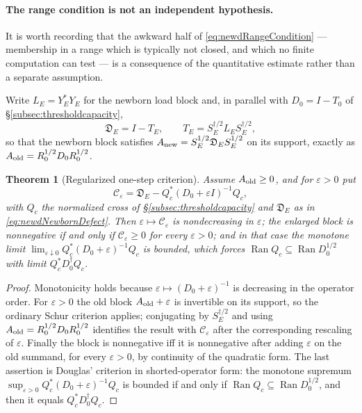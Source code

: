 \documentclass[11pt]{amsart}
\newtheorem{theorem}{Theorem}[section]
\theoremstyle{definition}
\theoremstyle{remark}
\begin{document}
\paragraph{The range condition is not an independent hypothesis.}
It is worth recording that the awkward half of
\eqref{eq:newdRangeCondition} --- membership in a range which is typically
not closed, and which no finite computation can test --- is a consequence of
the quantitative estimate rather than a separate assumption.

Write \(L_E=Y_E^*Y_E\) for the newborn load block and, in parallel with
\(D_0=I-T_0\) of \S\ref{subsec:thresholdcapacity},
\begin{equation}\label{eq:newdNewbornDefect}
 \mathfrak D_E=I-T_E,
 \qquad
 T_E=S_E^{\dagger/2}L_ES_E^{\dagger/2},
\end{equation}
so that the newborn block satisfies
\(A_{\rm new}=S_E^{1/2}\mathfrak D_ES_E^{1/2}\) on its support, exactly as
\(A_{\rm old}=R_0^{1/2}D_0R_0^{1/2}\).

\begin{theorem}[Regularized one-step criterion]\label{thm:newdRegularizedStep}
Assume \(A_{\rm old}\ge0\), and for \(\varepsilon>0\) put
\[
 \mathcal C_\varepsilon
 =\mathfrak D_E-Q_c^*(D_0+\varepsilon I)^{-1}Q_c ,
\]
with \(Q_c\) the normalized cross of \S\ref{subsec:thresholdcapacity} and
\(\mathfrak D_E\) as in \eqref{eq:newdNewbornDefect}.
Then \(\varepsilon\mapsto\mathcal C_\varepsilon\) is nondecreasing in
\(\varepsilon\); the enlarged block is nonnegative if and only if
\(\mathcal C_\varepsilon\ge0\) for every \(\varepsilon>0\); and in that case
the monotone limit \(\lim_{\varepsilon\downarrow0}
Q_c^*(D_0+\varepsilon)^{-1}Q_c\) is bounded, which \emph{forces}
\(\operatorname{Ran}Q_c\subseteq\operatorname{Ran}D_0^{1/2}\) with limit
\(Q_c^*D_0^\dagger Q_c\).
\end{theorem}

\begin{proof}
Monotonicity holds because \(\varepsilon\mapsto(D_0+\varepsilon)^{-1}\) is
decreasing in the operator order.  For \(\varepsilon>0\) the old block
\(A_{\rm old}+\varepsilon\) is invertible on its support, so the ordinary
Schur criterion applies; conjugating by \(S_E^{\dagger/2}\) and using
\(A_{\rm old}=R_0^{1/2}D_0R_0^{1/2}\) identifies the result with
\(\mathcal C_\varepsilon\) after the corresponding rescaling of
\(\varepsilon\).  Finally the block is nonnegative iff it is nonnegative
after adding \(\varepsilon\) on the old summand, for every \(\varepsilon>0\),
by continuity of the quadratic form.  The last assertion is Douglas'
criterion in shorted-operator form: the monotone supremum
\(\sup_{\varepsilon>0}Q_c^*(D_0+\varepsilon)^{-1}Q_c\) is bounded if and only
if \(\operatorname{Ran}Q_c\subseteq\operatorname{Ran}D_0^{1/2}\), and then it
equals \(Q_c^*D_0^\dagger Q_c\).
\end{proof}
\end{document}
